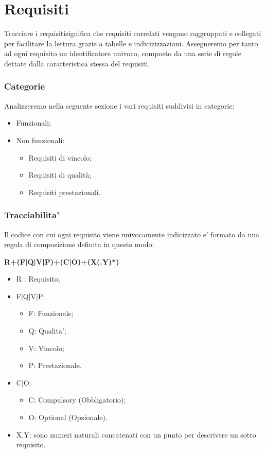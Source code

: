 
\section{Requisiti}
    Tracciare i requisiti\pedice significa che requisiti correlati vengono raggruppati e collegati per facilitare la lettura grazie a tabelle e indicizizzazioni.
    Assegneremo per tanto ad ogni requisito un identificatore univoco, composto da una serie di regole dettate dalla caratteristica stessa del requisiti.
    
    \subsubsection{Categorie}
    Analizzeremo nella seguente sezione i vari requisiti suddivisi in categorie:
    \begin{itemize}
        \item Funzionali;
        \item Non funzionali:
            \begin{itemize}
                \item Requisiti di vincolo;
                \item Requisiti di qualità;
                \item Requisiti prestazionali.
            \end{itemize}
    \end{itemize}
    
    \subsubsection{Tracciabilita'}
    Il codice con cui ogni requisito viene univocamente indicizzato e' formato da una regola di composizione definita in questo modo:
    \newline
    
    \begin{center}
        \textbf{R+(F|Q|V|P)+(C|O)+(X(.Y)*)}    
    \end{center}
    
    
    \begin{itemize}
        \item R : Requisito;
        \item F|Q|V|P:
            \begin{itemize}
                \item F: Funzionale;
                \item Q: Qualita';
                \item V: Vincolo;
                \item P: Prestazionale.
            \end{itemize}
        \item C|O:
            \begin{itemize}
                \item C: Compulsory (Obbligatorio);
                \item O: Optional (Opzionale).
            \end{itemize}
        \item X.Y: sono numeri naturali concatenati con un punto per descrivere un sotto requisito.
    \end{itemize}
    
